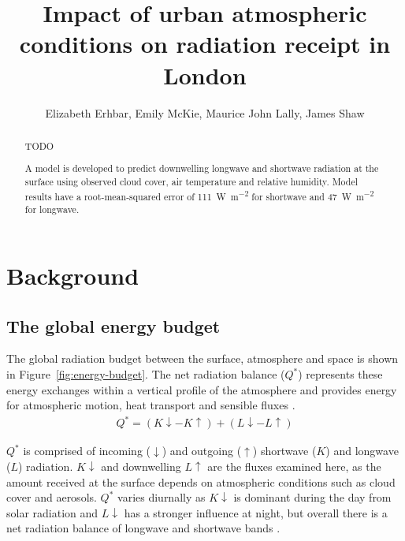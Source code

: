 \documentclass[a4paper,titlepage, twoside]{report}
\newcommand\Kdown{K\!\!\downarrow}
\newcommand\Kup{K\!\!\uparrow}
\newcommand\Ldown{L\!\!\downarrow}
\newcommand\Lup{L\!\!\uparrow}
\begin{document}
\expandafter\def\csname PY@tok@err\endcsname{}

\title{Impact of urban atmospheric conditions on radiation receipt in London}
\author{Elizabeth Erhbar, Emily McKie, Maurice John Lally, James Shaw}
\maketitle

\begin{abstract}
TODO

A model is developed to predict downwelling longwave and shortwave radiation at the surface using observed cloud cover, air temperature and relative humidity.  Model results have a root-mean-squared error of \SI{111}{\watt\per\meter\squared} for shortwave and \SI{47}{\watt\per\meter\squared} for longwave.
\end{abstract}

\tableofcontents

\chapter{Background}
\section{The global energy budget}
The global radiation budget between the surface, atmosphere and space is shown in Figure~\ref{fig:energy-budget}.  The net radiation balance ($Q^\ast$) represents these energy exchanges within a vertical profile of the atmosphere and provides energy for atmospheric motion, heat transport and sensible fluxes \parencite{offerle}.
\begin{align}
Q^\ast = \left( \Kdown - \Kup \right) + \left( \Ldown - \Lup \right)
\end{align}

$Q^\ast$ is comprised of incoming ($\downarrow$) and outgoing ($\uparrow$) shortwave ($K$) and longwave ($L$) radiation. $\Kdown$ and downwelling $\Lup$ are the fluxes examined here, as the amount received at the surface depends on atmospheric conditions such as cloud cover and aerosols. $Q^\ast$ varies diurnally as $\Kdown$ is dominant during the day from solar radiation and $\Ldown$ has a stronger influence at night, but overall there is a net radiation balance of longwave and shortwave bands \parencite{oke}.
\end{document}

